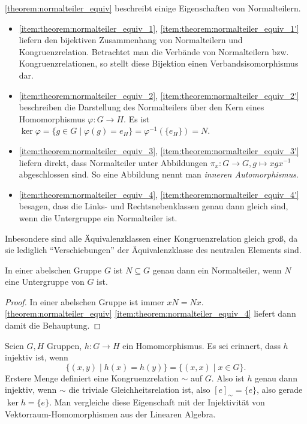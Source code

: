 \begin{remark}
    \cref{theorem:normalteiler_equiv} beschreibt einige Eigenschaften von Normalteilern.
    \begin{itemize}[label={--}]
        \item \ref*{item:theorem:normalteiler_equiv_1}, \ref*{item:theorem:normalteiler_equiv_1'} liefern den bijektiven Zusammenhang von Normalteilern und Kongruenzrelation. Betrachtet man die Verbände von Normalteilern bzw. Kongruenzrelationen, so stellt diese Bijektion einen Verbandsisomorphismus dar.
        \item \ref*{item:theorem:normalteiler_equiv_2}, \ref*{item:theorem:normalteiler_equiv_2'} beschreiben die Darstellung des Normalteilers über den Kern eines Homomorphismus $\varphi: G \to H$. Es ist $\ker \varphi = \{g \in G \mid \varphi(g) = e_H\} = \varphi^{-1}(\{e_H\}) = N$.
        \item \ref*{item:theorem:normalteiler_equiv_3}, \ref*{item:theorem:normalteiler_equiv_3'} liefern direkt, dass Normalteiler unter Abbildungen $\pi_x: G \to G, g \mapsto xgx^{-1}$ abgeschlossen sind. So eine Abbildung nennt man \emph{inneren Automorphismus}.
        \item \ref*{item:theorem:normalteiler_equiv_4}, \ref*{item:theorem:normalteiler_equiv_4'} besagen, dass die Links- und Rechtsnebenklassen genau dann gleich sind, wenn die Untergruppe ein Normalteiler ist.
    \end{itemize}

    Inbesondere sind alle Äquivalenzklassen einer Kongruenzrelation gleich groß, da sie lediglich ``Verschiebungen'' der Äquivalenzklasse des neutralen Elements sind.
\end{remark}

\begin{corollary} \label{corollary:abelsch-normalteiler-untergruppe}
    In einer abelschen Gruppe $G$ ist $N \subseteq G$ genau dann ein Normalteiler, wenn $N$ eine Untergruppe von $G$ ist.
\end{corollary}
\begin{proof}
    In einer abelschen Gruppe ist immer $xN = Nx$. \cref{theorem:normalteiler_equiv} \ref*{item:theorem:normalteiler_equiv_4} liefert dann damit die Behauptung.
\end{proof}


\begin{remark} \label{remark:gruppe-injektiv-kern-trivial}
    Seien $G, H$ Gruppen, $h : G \to H$ ein Homomorphismus. Es sei erinnert, dass $h$ injektiv ist, wenn
    $$ \{ (x,y) \mid h(x) = h(y) \} = \{ (x,x) \mid x \in G \}. $$
    Erstere Menge definiert eine Kongruenzrelation $\sim$ auf $G$. Also ist $h$ genau dann injektiv, wenn $\sim$ die triviale Gleichheitsrelation ist, also $[e]_\sim = \{e\}$, also gerade $\ker h = \{ e \}$. Man vergleiche diese Eigenschaft mit der Injektivität von Vektorraum-Homomorphismen aus der Linearen Algebra.
\end{remark}

